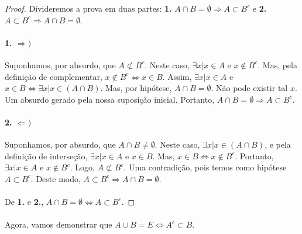 \documentclass[11pt,a4paper]{report}
\begin{document}
    \begin{proof}
    Divideremos a prova em duas partes: \textbf{1.} $A \cap B = \emptyset \Rightarrow A \subset B^c$ e \textbf{2.} $ A\subset B^c \Rightarrow A \cap B = \emptyset$.

    \paragraph{1. $\Rightarrow)$}
    Suponhamos, por absurdo, que $A \not\subset B^c$. Neste caso, $\exists x | x \in A$ e $x \not\in B^c$. Mas, pela definição de complementar, $x \not\in B^c \Leftrightarrow x \in B$. Assim, $\exists x | x \in A$ e $x \in B \Leftrightarrow \exists x | x \in (A \cap B)$. Mas, por hipótese, $A \cap B = \emptyset$. Não pode existir tal $x$. Um absurdo gerado pela nossa suposição inicial. Portanto, $A \cap B = \emptyset \Rightarrow A \subset B^c$.


    \paragraph{2. $\Leftarrow)$}
    Suponhamos, por absurdo, que $A \cap B \not= \emptyset.$ Neste caso, $\exists x | x \in (A \cap B)$, e pela definição de interseção, $\exists x| x \in A $ e $x \in B$. Mas, $x \in B \Leftrightarrow x \not\in B^c$. Portanto, $\exists x | x \in A $ e $x \not\in B^c$. Logo, $A \not\subset B^c$. Uma contradição, pois temos como hipótese $A \subset B^c$. Deste modo, $A \subset B^c \Rightarrow A \cap B = \emptyset$.

    \paragraph{}
    De \textbf{1.} e \textbf{2.}, $A \cap B = \emptyset \Leftrightarrow A \subset B^c$.
    \end{proof}
    
    \paragraph{}
    Agora, vamos demonstrar que $A \cup B = E \Leftrightarrow A^c \subset B$.
\end{document}

